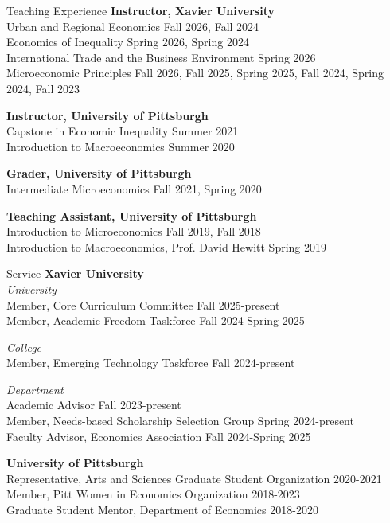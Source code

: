 \documentclass{resume} %
\begin{document}
\begin{rSection}{Teaching Experience}
{\bf Instructor, Xavier University}\\
Urban and Regional Economics \hfill {Fall 2026, Fall 2024}\\
Economics of Inequality \hfill {Spring 2026, Spring 2024}\\
International Trade and the Business Environment \hfill {Spring 2026} \\
Microeconomic Principles \hfill {Fall 2026, Fall 2025, Spring 2025, Fall 2024, Spring 2024, Fall 2023}

{\bf Instructor, University of Pittsburgh} \\
Capstone in Economic Inequality \hfill {Summer 2021} \\
Introduction to Macroeconomics \hfill {Summer 2020} 

{\bf Grader, University of Pittsburgh} \\
Intermediate Microeconomics \hfill {Fall 2021, Spring 2020} 

{\bf Teaching Assistant, University of Pittsburgh} \\
	Introduction to Microeconomics \hfill {Fall 2019, Fall 2018}\\
	Introduction to Macroeconomics, Prof. David Hewitt \hfill {Spring 2019} 
\end{rSection}


\begin{rSection}{Service}
	{\bf Xavier University} \\
	{\textit{University} }\\
	Member, Core Curriculum Committee \hfill {Fall 2025-present}\\
	Member, Academic Freedom Taskforce \hfill{Fall 2024-Spring 2025}

	{\textit{College}} \\
	Member, Emerging Technology Taskforce \hfill {Fall 2024-present}

	{\textit{Department}}\\
	Academic Advisor \hfill {Fall 2023-present}\\
	Member, Needs-based Scholarship Selection Group \hfill {Spring 2024-present} \\
	Faculty Advisor, Economics Association \hfill {Fall 2024-Spring 2025}

	{\bf University of Pittsburgh}\\
	Representative, Arts and Sciences Graduate Student Organization \hfill {2020-2021}\\
	Member, Pitt Women in Economics Organization \hfill {2018-2023}\\
	Graduate Student Mentor, Department of Economics \hfill {2018-2020}
	\end{rSection}
	\pagebreak
\end{document}
